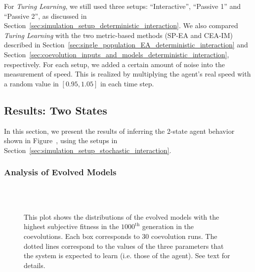 For \textit{Turing Learning}, we still used three setups: ``Interactive'', ``Passive 1'' and ``Passive 2'', as discussed in Section~\ref{sec:simulation_setup_deterministic_interaction}. We also compared \textit{Turing Learning} with the two metric-based methods (SP-EA and CEA-IM) described in Section~\ref{sec:single_population_EA_deterministic_interaction} and Section~\ref{sec:coevolution_inputs_and_models_deterministic_interaction}, respectively. For each setup, we added a certain amount of noise into the measurement of speed. This is realized by multiplying the agent's real speed with a random value in $[0.95, 1.05]$ in each time step. 

\subsection{Results: Two States}\label{sec:results_interaction_stochastic_2states}

In this section, we present the results of inferring the 2-state agent behavior shown in Figure~, using the setups in Section~\ref{sec:simulation_setup_stochastic_interaction}. 


\subsubsection{Analysis of Evolved Models}
\begin{figure}[!t]%
	\centering
		\\
		\\
		\caption{This plot shows the distributions of the evolved models with the highest subjective fitness in the $1000^\textrm{th}$ generation in the coevolutions. Each box corresponds to $30$ coevolution runs. The dotted lines correspond to the values of the three parameters that the system is expected to learn (i.e. those of the agent). See text for details.\label{fig:parameters_box_stochastic_two states}}
\end{figure}

